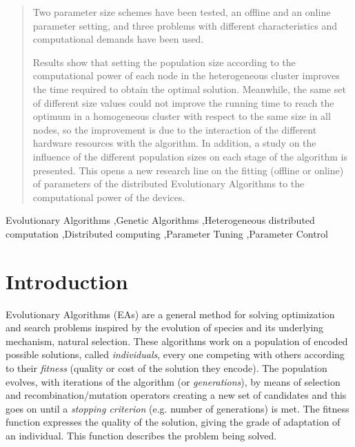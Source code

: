 \documentclass[final,1p,times]{elsarticle}
\begin{document}
\begin{frontmatter}
\begin{abstract}
Two  parameter size schemes have been tested, an offline and an online parameter setting, and three 
problems with different characteristics and computational demands have
been used. 

Results show
that setting the population size according to the computational power
of each node in the heterogeneous cluster improves the time required
to obtain the optimal solution. 
Meanwhile, the same set of
different size values could not improve the running time  to reach the optimum 
 in a homogeneous
cluster with respect to the same size in all nodes, so the improvement is due to the interaction of the different hardware
resources with the algorithm. In addition, a study on the influence of
the different population sizes on each stage of the algorithm is
presented. This opens a new research line on the fitting (offline
or online) of parameters of the distributed Evolutionary Algorithms to the computational power of the devices.





 
\end{abstract}

\begin{keyword}

Evolutionary Algorithms \sep Genetic Algorithms \sep Heterogeneous distributed computation \sep Distributed computing \sep Parameter Tuning \sep Parameter Control

\end{keyword}

\end{frontmatter}

\section{Introduction}
\label{sec:intro}



Evolutionary Algorithms (EAs) are a general method for solving
optimization and search problems inspired by the evolution of species
and its underlying mechanism, natural selection. These algorithms work
on a population of encoded
possible solutions, called {\em individuals}, every one competing with others according to their
{\em fitness} (quality or cost of the solution they encode). The population evolves, with iterations of the algorithm (or {\em generations}), 
by means of selection and recombination/mutation operators 
creating a new set of candidates and this goes on until a {\em stopping criterion}
(e.g. number of generations) is met. The fitness function expresses
the quality of the solution, giving the grade of adaptation of an
individual. This function describes the problem being
solved. 
\end{document}
